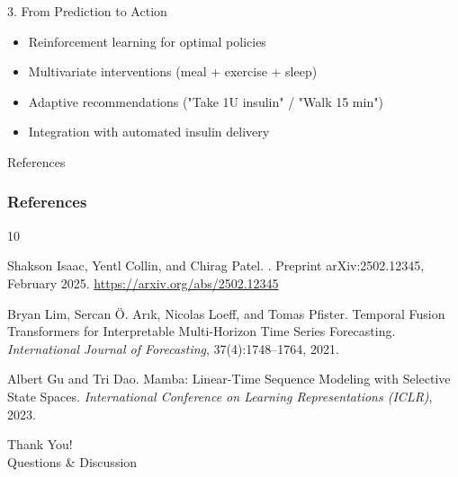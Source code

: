 \documentclass[aspectratio=169,xcolor=dvipsnames]{beamer}
\begin{document}
\begin{frame}
    \begin{block}{3. From Prediction to Action}
        \begin{itemize}
            \item Reinforcement learning for optimal policies
            \item Multivariate interventions (meal + exercise + sleep)
            \item Adaptive recommendations ("Take 1U insulin" / "Walk 15 min")
            \item Integration with automated insulin delivery
        \end{itemize}
    \end{block}
\end{frame}

\begin{frame}[allowframebreaks]{References}
\frametitle{References}
\begin{thebibliography}{10}
\setlength{\itemsep}{0.5em}

Shakson Isaac, Yentl Collin, and Chirag Patel.
.
\newblock Preprint arXiv:2502.12345, February 2025.
\newblock \textcolor{blue}{\url{https://arxiv.org/abs/2502.12345}}

Bryan Lim, Sercan Ö. Arık, Nicolas Loeff, and Tomas Pfister.
\newblock Temporal Fusion Transformers for Interpretable Multi-Horizon Time Series Forecasting.
\newblock \emph{International Journal of Forecasting}, 37(4):1748--1764, 2021.

Albert Gu and Tri Dao.
\newblock Mamba: Linear-Time Sequence Modeling with Selective State Spaces.
\newblock \emph{International Conference on Learning Representations (ICLR)}, 2023.

\end{thebibliography}
\end{frame}

\begin{frame}[standout]
    \centering
    \Huge Thank You! \\
    \vspace{1cm}
    \Large Questions \& Discussion
    
    \vspace{2cm}
    \normalsize
\end{frame}
\end{document}
